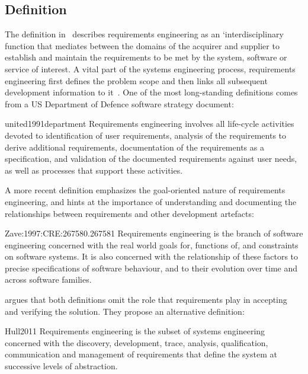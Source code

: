 \documentclass[dissertation,final]{softeng}
\begin{document}
\subsection{Definition}
The definition in~ describes requirements engineering as an `interdisciplinary function that mediates between the domains of the acquirer and supplier to establish and maintain the requirements to be met by the system, software or service of interest. A vital part of the systems engineering process, requirements engineering first defines the problem scope and then links all subsequent development information to it~\citep{Hull2011}. One of the most long-standing definitions comes from a US Department of Defence software strategy document:

\begin{displaycquote}{united1991department}
Requirements engineering involves all life-cycle activities devoted to identification of user requirements, analysis of the requirements to derive additional requirements, documentation of the requirements as a specification, and validation of the documented requirements against user needs, as well as processes that support these activities.
\end{displaycquote}

A more recent definition emphasizes the goal-oriented nature of requirements engineering, and hints at the importance of understanding and documenting the relationships between requirements and other development artefacts:

\begin{displaycquote}{Zave:1997:CRE:267580.267581}
Requirements engineering is the branch of software engineering concerned with the real world goals for, functions of, and constraints on software systems. It is also concerned with the relationship of these factors to precise specifications of software behaviour, and to their evolution over time and across software families.
\end{displaycquote}

\citet{Hull2011} argues that both definitions omit the role that requirements play in accepting and verifying the solution. They propose an alternative definition:

\begin{displaycquote}{Hull2011}
Requirements engineering is the subset of systems engineering concerned with the discovery, development, trace, analysis, qualification, communication and management of requirements that define the system at successive levels of abstraction.
\end{displaycquote}
\end{document}
